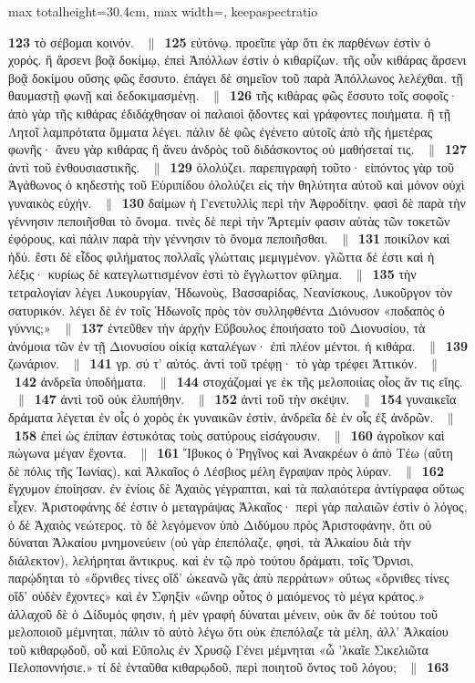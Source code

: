 \documentclass[11pt,twoside]{book}
\newcommand{\expo}[1]{\textsuperscript{#1}}
\newcommand{\espTest}{\ {\color{ruleGold}$\parallel$}\ }
\begin{document}
\begin{adjustbox}{max totalheight=30.4cm, max width=\textwidth, keepaspectratio}
\begin{minipage}{\textwidth}
{\noindent{\bfseries\scshape\color{rubricRed}Scholies marginales et gloses interlinéaires du folio ({\policeGr Σ}\expo{R}) :} \textbf{123} τὸ σέβομαι κοινόν. \espTest \textbf{125} εὐτόνῳ. προεῖπε γὰρ ὅτι ἐκ παρθένων ἐστὶν ὁ χορός. ἢ ἄρσενι βοᾷ δοκίμῳ, ἐπεὶ Ἀπόλλων ἐστὶν ὁ κιθαρίζων. τῆς οὖν κιθάρας ἄρσενι βοᾷ δοκίμου οὔσης φῶς ἔσσυτο. ἐπάγει δὲ σημεῖον τοῦ παρὰ Ἀπόλλωνος λελέχθαι. τῇ θαυμαστῇ φωνῇ καὶ δεδοκιμασμένῃ. \espTest \textbf{126} τῆς κιθάρας φῶς ἔσσυτο τοῖς σοφοῖς· ἀπὸ γὰρ τῆς κιθάρας ἐδιδάχθησαν οἱ παλαιοὶ ᾄδοντες καὶ γράφοντες ποιήματα. ἢ τῇ Λητοῖ λαμπρότατα ὄμματα λέγει. πάλιν δὲ φῶς ἐγένετο αὐτοῖς ἀπὸ τῆς ἡμετέρας φωνῆς· ἄνευ γὰρ κιθάρας ἢ ἄνευ ἀνδρὸς τοῦ διδάσκοντος οὐ μαθήσεταί τις. \espTest \textbf{127} ἀντὶ τοῦ ἐνθουσιαστικῆς. \espTest \textbf{129} ὀλολύζει. παρεπιγραφὴ τοῦτο· εἰπόντος γὰρ τοῦ Ἀγάθωνος ὁ κηδεστὴς τοῦ Εὐριπίδου ὀλολύζει εἰς τὴν θηλύτητα αὐτοῦ καὶ μόνον οὐχὶ γυναικὸς εὐχήν. \espTest \textbf{130} δαίμων ἡ Γενετυλλὶς περὶ τὴν Ἀφροδίτην. φασὶ δὲ παρὰ τὴν γέννησιν πεποιῆσθαι τὸ ὄνομα. τινὲς δὲ περὶ τὴν Ἄρτεμίν φασιν αὐτὰς τῶν τοκετῶν ἐφόρους, καὶ πάλιν παρὰ τὴν γέννησιν τὸ ὄνομα πεποιῆσθαι. \espTest \textbf{131} ποικίλον καὶ ἡδύ. ἔστι δὲ εἶδος φιλήματος πολλαῖς γλώτταις μεμιγμένον. γλῶττα δέ ἐστι καὶ ἡ λέξις· κυρίως δὲ κατεγλωττισμένον ἐστὶ τὸ ἔγγλωττον φίλημα. \espTest \textbf{135} τὴν τετραλογίαν λέγει Λυκουργίαν, Ἠδωνοὺς, Βασσαρίδας, Νεανίσκους, Λυκοῦργον τὸν σατυρικόν. λέγει δὲ ἐν τοῖς Ἠδωνοῖς πρὸς τὸν συλληφθέντα Διόνυσον «ποδαπὸς ὁ γύννις;» \espTest \textbf{137} ἐντεῦθεν τὴν ἀρχὴν Εὔβουλος ἐποιήσατο τοῦ Διονυσίου, τὰ ἀνόμοια τῶν ἐν τῇ Διονυσίου οἰκίᾳ καταλέγων· ἐπὶ πλέον μέντοι. ἡ κιθάρα. \espTest \textbf{139} ζωνάριον. \espTest \textbf{141} γρ. σύ τ’ αὐτός. ἀντὶ τοῦ τρέφῃ· τὸ γὰρ τρέφει Ἀττικόν. \espTest \textbf{142} ἀνδρεῖα ὑποδήματα. \espTest \textbf{144} στοχάζομαί γε ἐκ τῆς μελοποιίας οἷος ἄν τις εἴης. \espTest \textbf{147} ἀντὶ τοῦ οὐκ ἐλυπήθην. \espTest \textbf{152} ἀντὶ τοῦ τὴν σκέψιν. \espTest \textbf{154} γυναικεῖα δράματα λέγεται ἐν οἷς ὁ χορὸς ἐκ γυναικῶν ἐστὶν, ἀνδρεῖα δὲ ἐν οἷς ἐξ ἀνδρῶν. \espTest \textbf{158} ἐπεὶ ὡς ἐπίπαν ἐστυκότας τοὺς σατύρους εἰσάγουσιν. \espTest \textbf{160} ἀγροῖκον καὶ πώγωνα μέγαν ἔχοντα. \espTest \textbf{161} Ἴβυκος ὁ Ῥηγῖνος καὶ Ἀνακρέων ὁ ἀπὸ Τέω (αὕτη δὲ πόλις τῆς Ἰωνίας), καὶ Ἀλκαῖος ὁ Λέσβιος μέλη ἔγραψαν πρὸς λύραν. \espTest \textbf{162} ἔγχυμον ἐποίησαν. ἐν ἐνίοις δὲ Ἀχαιὸς γέγραπται, καὶ τὰ παλαιότερα ἀντίγραφα οὕτως εἶχεν. Ἀριστοφάνης δέ ἐστιν ὁ μεταγράψας Ἀλκαῖος· περὶ γὰρ παλαιῶν ἐστὶν ὁ λόγος, ὁ δὲ Ἀχαιὸς νεώτερος. τὸ δὲ λεγόμενον ὑπὸ Διδύμου πρὸς Ἀριστοφάνην, ὅτι οὐ δύναται Ἀλκαίου μνημονεύειν (οὐ γὰρ ἐπεπόλαζε, φησὶ, τὰ Ἀλκαίου διὰ τὴν διάλεκτον), λελήρηται ἄντικρυς. καὶ ἐν τῷ πρὸ τούτου δράματι, τοῖς Ὄρνισι, παρῴδηται τὸ «ὄρνιθες τίνες οἵδ’ ὠκεανῶ γᾶς ἀπὺ περράτων» οὕτως «ὄρνιθες τίνες οἵδ’ οὐδὲν ἔχοντες» καὶ ἐν Σφηξὶν «ὤνηρ οὗτος ὁ μαιόμενος τὸ μέγα κράτος.» ἀλλαχοῦ δὲ ὁ Δίδυμός φησιν, ἡ μὲν γραφὴ δύναται μένειν, οὐκ ἂν δὲ τούτου τοῦ μελοποιοῦ μέμνηται, πάλιν τὸ αὐτὸ λέγω ὅτι οὐκ ἐπεπόλαζε τὰ μέλη, ἀλλ’ Ἀλκαίου τοῦ κιθαρῳδοῦ, οὗ καὶ Εὔπολις ἐν Χρυσῷ Γένει μέμνηται «ὦ ’λκαῖε Σικελιῶτα Πελοποννήσιε.» τί δὲ ἐνταῦθα κιθαρῳδοῦ, περὶ ποιητοῦ ὄντος τοῦ λόγου; \espTest \textbf{163} }
\end{minipage}
\end{adjustbox}
\end{document}
